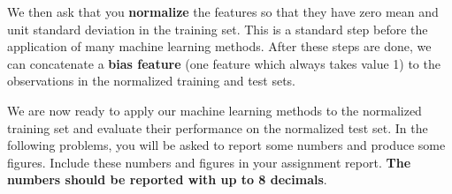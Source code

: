 \documentclass[submit]{harvardml}
\begin{document}
We then ask that you \textbf{normalize} the features so that they have
zero mean and unit standard deviation in the training set. This is a
standard step before the application of many machine learning
methods. After these steps are done, we can concatenate a \textbf{bias
  feature} (one feature which always takes value 1) to the
observations in the normalized training and test sets.


We are now ready to apply our machine learning methods to the normalized training set and
evaluate their performance on the normalized test set.
In the following problems, you will be asked to report some numbers and produce
some figures. Include these numbers and figures in your assignment report.
{\bf The numbers should be reported with up to 8 decimals}.
\vspace{0.2cm}
\end{document}
